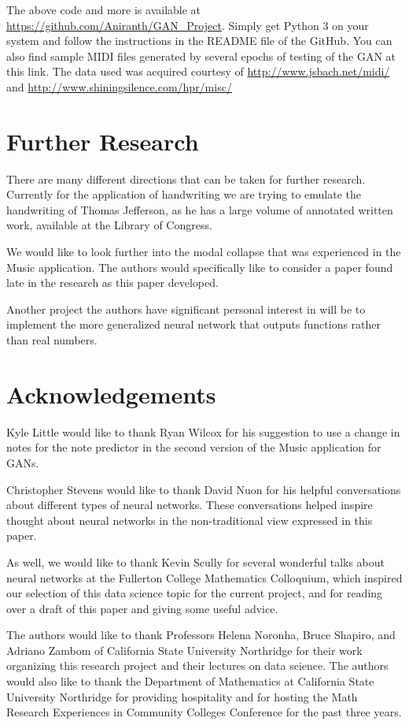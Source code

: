 \documentclass[12pt]{amsart}
\theoremstyle{definition}
\theoremstyle{remark}
\begin{document}
The above code and more is available at
\href{https://github.com/Aniranth/GAN_Project}{https://github.com/Aniranth/GAN\_Project}.
Simply get Python 3 on your system and follow the instructions in 
the README file of the GitHub. You can also find sample MIDI files 
generated by several epochs of testing of the GAN at this link. The data used 
was acquired courtesy of \href{http://www.jsbach.net/midi/}{http://www.jsbach.net/midi/}
and \href{http://www.shiningsilence.com/hpr/misc/}{http://www.shiningsilence.com/hpr/misc/}


\section{Further Research}
There are many different directions that can be taken for further research.
Currently for the application of handwriting we are trying to emulate the handwriting
of Thomas Jefferson, as he has a large volume of annotated written work, available at
the Library of Congress.

We would like to look further into the modal collapse that was experienced in the
Music application. The authors would specifically like to consider a paper found
late in the research as this paper developed.\cite{1809.09087}

Another project the authors have significant personal interest in will be to
implement the more generalized neural network that outputs functions rather than
real numbers.

\section{Acknowledgements}
Kyle Little would like to thank Ryan Wilcox for his suggestion to use a change 
in notes for the note predictor in the second version of the Music application for GANs.

Christopher Stevens would like to thank David Nuon for his helpful conversations
about different types of neural networks. These conversations helped inspire thought about 
neural networks in the non-traditional view expressed in this paper.

As well, we would like to thank Kevin Scully for several wonderful talks about 
neural networks at the Fullerton College Mathematics Colloquium, which inspired 
our selection of this data science topic for the current project, and for
reading over a draft of this paper and giving some useful advice. 

The authors would like to thank Professors Helena Noronha, Bruce Shapiro, and 
Adriano Zambom of California State University Northridge for their work organizing
this research project and their
lectures on data science. The authors would also like to thank the Department 
of Mathematics at California State University Northridge  for providing 
hospitality and for hosting the Math Research Experiences in Community 
Colleges Conference  for the past three years.
\end{document}
